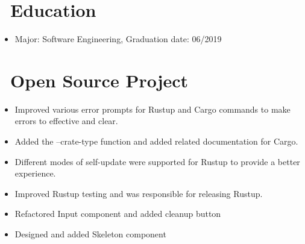 \documentclass{resume}
\newcommand{\en}[1]{#1}
\newcommand{\zh}[1]{}
\begin{document}
\section{\faGraduationCap\ \en{Education}\zh{教育经历}}
\en{}
\zh{\datedsubsection{\textbf{重庆理工大学}, 本科}{2015/09 -- 2019/06}}
\begin{itemize}
      \item \en{Major: Software Engineering, Graduation date: 06/2019}
            \zh{软件工程，2019 年 6 月毕业}
\end{itemize}

\section{\faGithubAlt\ \en{Open Source Project}\zh{开源项目}}
\en{}
\zh{\role{活跃维护者}{\href{https://github.com/search?q=repo:rust-lang/cargo+repo:rust-lang/rustup++author:hi-rustin&type=commits}{260+ 个提交}}}
\begin{itemize}
      \item \en{Improved various error prompts for Rustup and Cargo commands to make errors to effective and clear.}
            \zh{改善了大量 Rustup 和 Cargo 命令的错误提示，让错误更有效更清晰。}
      \item \en{Added the --crate-type function and added related documentation for Cargo.}
            \zh{为 Cargo 添加了 --crate-type 功能和相关文档。}
      \item \en{Different modes of self-update were supported for Rustup to provide a better experience.}
            \zh{为 Rustup 支持了 self-update 的不同模式来提供更好的使用体验。}
      \item \en{Improved Rustup testing and was responsible for releasing Rustup.}
            \zh{改善 Rustup 测试，负责发布 Rustup。}
\end{itemize}

\en{}
\zh{\role{前维护者}{\href{https://github.com/ant-design/ant-design/commits?author=hi-rustin}{24+ 个提交}}}
\begin{itemize}
      \item \en{Refactored Input component and added cleanup button}
            \zh{重构 Input 组件，添加清理按钮}
      \item \en{Designed and added Skeleton component}
            \zh{设计并添加 Skeleton 组件}
\end{itemize}
\end{document}
